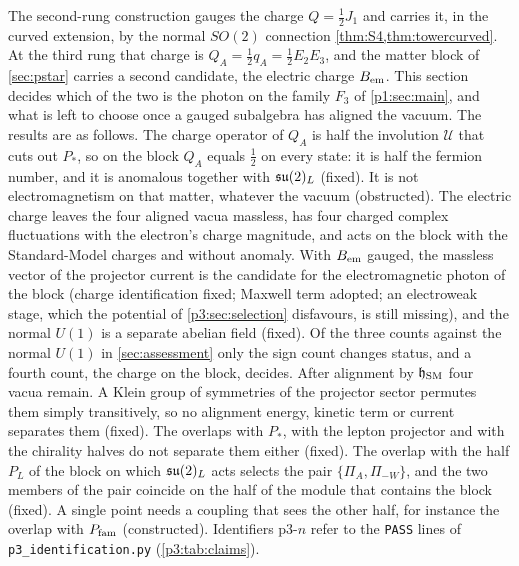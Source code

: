The second-rung construction gauges the charge $Q=\tfrac12J_1$ and carries it, in the curved extension, by the normal $SO(2)$ connection
\cref{thm:S4,thm:towercurved}. At the third rung that charge is $Q_A=\tfrac12q_A=\tfrac12E_2E_3$, and the matter block of \cref{sec:pstar} carries a
second candidate, the electric charge $B_{\rm em}$. This section decides which of the two is the photon on the family $F_3$ of \cref{p1:sec:main}, and what is
left to choose once a gauged subalgebra has aligned the vacuum. The results are as follows. The charge operator of $Q_A$ is half the involution $\mathcal U$ that cuts
out $P_*$, so on the block $Q_A$ equals $\tfrac12$ on every state: it is half the fermion number, and it is anomalous together with $\mathfrak{su}(2)_L$ (fixed). It is not
electromagnetism on that matter, whatever the vacuum (obstructed). The electric charge leaves the four aligned vacua massless, has four charged complex
fluctuations with the electron's charge magnitude, and acts on the block with the Standard-Model charges and without anomaly. With $B_{\rm em}$ gauged, the
massless vector of the projector current is the candidate for the electromagnetic photon of the block (charge identification fixed; Maxwell term adopted;
an electroweak stage, which the potential of \cref{p3:sec:selection} disfavours, is still missing), and the normal $U(1)$ is a separate abelian field (fixed). Of the three
counts against the normal $U(1)$ in \cref{sec:assessment} only the sign count changes status, and a fourth count, the charge on the block, decides.
After alignment by $\mathfrak h_{\rm SM}$ four vacua remain. A Klein group of symmetries of the projector sector permutes them simply transitively, so no
alignment energy, kinetic term or current separates them (fixed). The overlaps with $P_*$, with the lepton projector and with the chirality halves do
not separate them either (fixed). The overlap with the half $P_L$ of the block on which $\mathfrak{su}(2)_L$ acts selects the pair $\{\Pi_A,\Pi_{-W}\}$, and the two
members of the pair coincide on the half of the module that contains the block (fixed). A single point needs a coupling that sees the other half, for
instance the overlap with $P_{\rm fam}$ (constructed). Identifiers p3-$n$ refer to the \texttt{PASS} lines of \texttt{p3\_identification.py}
(\cref{p3:tab:claims}).

